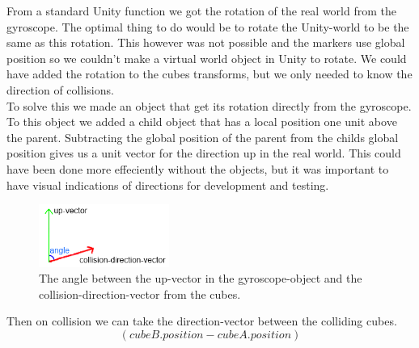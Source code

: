 From a standard Unity function we got the rotation of the real world from the gyroscope. The optimal thing to do would be to rotate the Unity-world to be the same as this rotation. This however was not possible and the markers use global position so we couldn't make a virtual world object in Unity to rotate. We could have added the rotation to the cubes transforms, but we only needed to know the direction of collisions. \\
To solve this we made an object that get its rotation directly from the gyroscope. To this object we added a child object that has a local position one unit above the parent. Subtracting the global position of the parent from the childs global position gives us a unit vector for the direction up in the real world. This could have been done more effeciently without the objects, but it was important to have visual indications of directions for development and testing.\\

\begin{figure}
        \capstart
        \centering
        \vspace{-10pt}
        \includegraphics[width=0.38\textwidth]{images/CollisionDirectionAngleModel.png}
        \vspace{-10pt}
        \caption[Model for finding the angle between the vectors]{The angle between the up-vector in the gyroscope-object and the collision-direction-vector from the cubes.}
        \vspace{-10pt}
        \label{fig:Vector_Angle_model}
\end{figure}

Then on collision we can take the direction-vector between the colliding cubes. 
\[
(cubeB.position - cubeA.position)
\]


